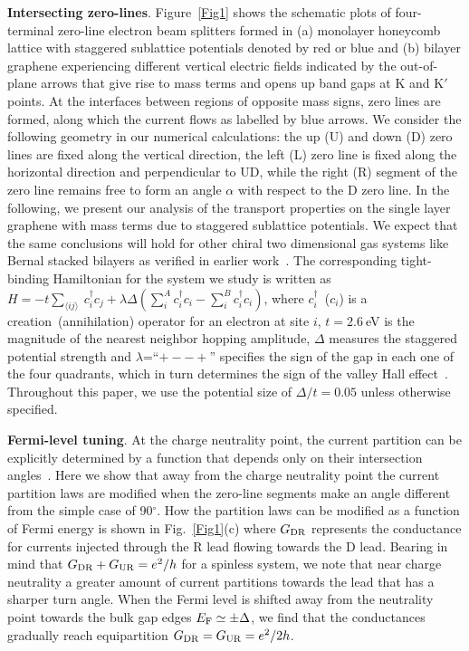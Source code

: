 \documentclass[journal=nalefd,manuscript=communication]{achemso}
\begin{document}
\textbf{Intersecting zero-lines}.
Figure~\ref{Fig1} shows the schematic plots of four-terminal zero-line electron beam splitters formed in (a) monolayer honeycomb lattice with staggered sublattice potentials denoted by red or blue and (b) bilayer graphene experiencing different vertical electric fields indicated by the out-of-plane arrows that give rise to mass terms and opens up band gaps at K and K$'$ points. At the interfaces between regions of opposite mass signs, zero lines are formed, along which the current flows as labelled by blue arrows. We consider the following geometry in our numerical calculations: the up (U) and down (D) zero lines are fixed along the vertical direction, the left (L) zero line is fixed along the horizontal direction and perpendicular to UD, while the right (R) segment of the zero line remains free to form an angle $\alpha$ with respect to the D zero line. In the following, we present our analysis of the transport properties on the single layer graphene with mass terms due to staggered sublattice potentials. We expect that the same conclusions will hold for other chiral two dimensional gas systems like Bernal stacked bilayers as verified in earlier work~\cite{Highway}. The corresponding tight-binding Hamiltonian for the system we study is written as $H =-t\sum_{\langle ij \rangle} ~ c_i^{\dag} c_j + \lambda\Delta (\sum^A_{i} c_{i}^{\dag} c_{i} - \sum^{B}_{i} c_{i}^{\dag} c_{i})$, where $c^{\dag}_i$~($c_{i}$) is a creation~(annihilation) operator for an electron at site $i$, $t=2.6~$eV is the magnitude of the nearest neighbor hopping amplitude, $\Delta$ measures the staggered potential strength and $\lambda$=``$+--+$'' specifies the sign of the gap in each one of the four quadrants, which in turn determines the sign of the valley Hall effect~\cite{valleyhall}. Throughout this paper, we use the potential size of $\Delta/t=0.05$ unless otherwise specified.

\textbf{Fermi-level tuning}.
At the charge neutrality point, the current partition can be explicitly determined by a function that depends only on their intersection angles~\cite{partition}. Here we show that away from the charge neutrality point the current partition laws are modified when the zero-line segments make an angle different from the simple case of 90$^{\circ}$. How the partition laws can be modified as a function of Fermi energy is shown in Fig.~\ref{Fig1}(c) where $G_{\rm DR}$ represents the conductance for currents injected through the R lead flowing towards the D lead. Bearing in mind that $G_{\rm DR} + G_{\rm UR} = e^2/h$ for a spinless system, we note that near charge neutrality a greater amount of current partitions towards the lead that has a sharper turn angle. When the Fermi level is shifted away from the neutrality point towards the bulk gap edges $E_{\rm F} \simeq \pm \Delta$, we find that the conductances gradually reach equipartition $G_{\rm DR} = G_{\rm UR} = e^2/2h$. 
\end{document}
